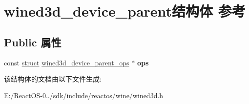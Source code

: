 \hypertarget{structwined3d__device__parent}{}\section{wined3d\+\_\+device\+\_\+parent结构体 参考}
\label{structwined3d__device__parent}
\subsection*{Public 属性}
\begin{DoxyCompactItemize}
\item 
\mbox{\label{structwined3d__device__parent_aa0449921f284135511a9f5533720a83f}} 
const \hyperlink{interfacestruct}{struct} \hyperlink{structwined3d__device__parent__ops}{wined3d\+\_\+device\+\_\+parent\+\_\+ops} $\ast$ {\bfseries ops}
\end{DoxyCompactItemize}


该结构体的文档由以下文件生成\+:\begin{DoxyCompactItemize}
\item 
E\+:/\+React\+O\+S-\/0../sdk/include/reactos/wine/wined3d.\+h\end{DoxyCompactItemize}
